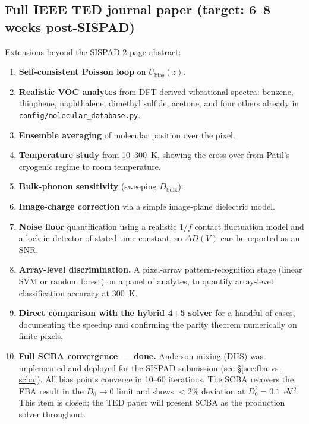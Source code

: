 \documentclass[11pt,a4paper,onecolumn]{article}
\newcommand{\code}[1]{\texttt{\small #1}}
\begin{document}
\subsection{Full IEEE TED journal paper (target: 6--8 weeks post-SISPAD)}
Extensions beyond the SISPAD 2-page abstract:
\begin{enumerate}[leftmargin=1.3em,itemsep=2pt]
\item \textbf{Self-consistent Poisson loop} on $U_{\mathrm{bias}}(z)$.
\item \textbf{Realistic VOC analytes} from DFT-derived vibrational spectra:
benzene, thiophene, naphthalene, dimethyl sulfide, acetone, and four
others already in \code{config/molecular\_database.py}.
\item \textbf{Ensemble averaging} of molecular position over the pixel.
\item \textbf{Temperature study} from 10--300~K, showing the cross-over
from Patil's cryogenic regime to room temperature.
\item \textbf{Bulk-phonon sensitivity} (sweeping $D_{\mathrm{bulk}}$).
\item \textbf{Image-charge correction} via a simple image-plane dielectric
model.
\item \textbf{Noise floor} quantification using a realistic
$1/f$ contact fluctuation model and a lock-in detector of stated
time constant, so $\Delta D(V)$ can be reported as an SNR.
\item \textbf{Array-level discrimination.} A pixel-array pattern-recognition
stage (linear SVM or random forest) on a panel of analytes, to quantify
array-level classification accuracy at 300~K.
\item \textbf{Direct comparison with the hybrid 4+5 solver} for a handful
of cases, documenting the speedup and confirming the parity theorem
numerically on finite pixels.
\item \textbf{Full SCBA convergence --- done.} Anderson mixing (DIIS) was
implemented and deployed for the SISPAD submission (see \S\ref{sec:fba-vs-scba}).
All bias points converge in 10--60 iterations. The SCBA recovers the FBA
result in the $D_0 \to 0$ limit and shows $<$2\% deviation at
$D_0^2 = 0.1$~eV$^2$. This item is closed; the TED paper will present
SCBA as the production solver throughout.
\end{enumerate}
\end{document}
